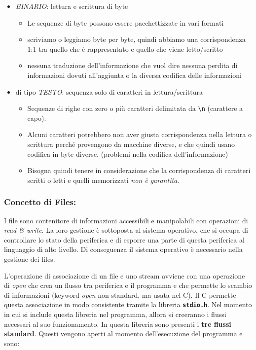 \documentclass[
]{article}
\begin{document}
\begin{itemize}
\item
  \emph{BINARIO}: lettura e scrittura di byte

  \begin{itemize}
  \item
    Le sequenze di byte possono essere pacchettizzate in vari formati
  \item
    scriviamo o leggiamo byte per byte, quindi abbiamo una
    corrispondenza 1:1 tra quello che è rappresentato e quello che viene
    letto/scritto
  \item
    nessuna traduzione dell'informazione che vuol dire nessuna perdita
    di informazioni dovuti all'aggiunta o la diversa codifica delle
    informazioni
  \end{itemize}
\item
  di tipo \emph{TESTO}: sequenza solo di caratteri in lettura/scrittura

  \begin{itemize}
  \item
    Sequenze di righe con zero o più caratteri delimitata da
    \texttt{\textbackslash{}n} (carattere a capo).
  \item
    Alcuni caratteri potrebbero non aver giusta corrispondenza nella
    lettura o scrittura perché provengono da macchine diverse, e che
    quindi usano codifica in byte diverse. (problemi nella codifica
    dell'informazione)
  \item
    Bisogna quindi tenere in considerazione che la corrispondenza di
    caratteri scritti o letti e quelli memorizzati \emph{non è
    garantita}.
  \end{itemize}
\end{itemize}

\hypertarget{header-n946}{%
\subsubsection{Concetto di Files:}\label{header-n946}}

I file sono contenitore di informazioni accessibili e manipolabili con
operazioni di \emph{read \& write}. La loro gestione è sottoposta al
sistema operativo, che si occupa di controllare lo stato della
periferica e di esporre una parte di questa periferica al linguaggio di
alto livello. Di conseguenza il sistema operativo è necessario nella
gestione dei files.

L'operazione di associazione di un file e uno stream avviene con una
operazione di \emph{open} che crea un flusso tra periferica e il
programma e che permette lo scambio di informazioni (keyword \emph{open}
non standard, ma usata nel C). Il C permette questa associazione in modo
consistente tramite la libreria \textbf{\texttt{stdio.h}}. Nel momento
in cui si include questa libreria nel programma, allora si creeranno i
flussi necessari al suo funzionamento. In questa libreria sono presenti
i \textbf{tre flussi standard}. Questi vengono aperti al momento
dell'esecuzione del programma e sono:
\end{document}
